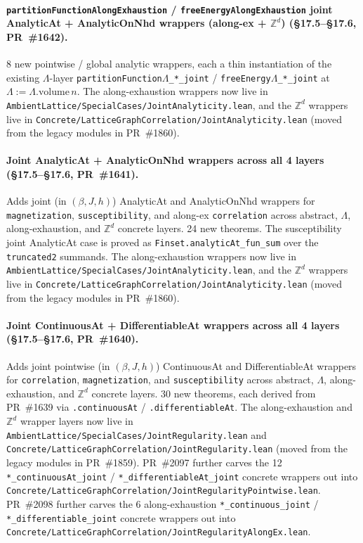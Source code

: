 \documentclass[a4paper,11pt]{article}
\newcommand{\LeanLambda}{\texorpdfstring{\ensuremath{\Lambda}}{Lambda}}
\begin{document}
\paragraph{\texttt{partitionFunctionAlongExhaustion} /
\texttt{freeEnergyAlongExhaustion} joint AnalyticAt + AnalyticOnNhd
wrappers (along-ex + $\mathbb{Z}^d$)
(\S17.5--\S17.6, PR~\#1642).} 8 new pointwise / global analytic
wrappers, each a thin instantiation of the existing $\Lambda$-layer
\texttt{partitionFunction\LeanLambda\_*\_joint} /
\texttt{freeEnergy\LeanLambda\_*\_joint} at
$\Lambda := \Lambda.\mathrm{volume}\,n$. The along-exhaustion wrappers
now live in
\texttt{AmbientLattice/SpecialCases/JointAnalyticity.lean}, and the
$\mathbb{Z}^d$ wrappers live in
\texttt{Concrete/LatticeGraphCorrelation/JointAnalyticity.lean}
(moved from the legacy modules in PR~\#1860).

\paragraph{Joint AnalyticAt + AnalyticOnNhd wrappers across
all 4 layers (\S17.5--\S17.6, PR~\#1641).} Adds joint (in
$(\beta, J, h)$) AnalyticAt and AnalyticOnNhd wrappers for
\texttt{magnetization}, \texttt{susceptibility}, and along-ex
\texttt{correlation} across abstract, $\Lambda$, along-exhaustion,
and $\mathbb{Z}^d$ concrete layers. 24 new theorems. The
susceptibility joint AnalyticAt case is proved as
\texttt{Finset.analyticAt\_fun\_sum} over the
\texttt{truncated2} summands. The along-exhaustion wrappers now live
in \texttt{AmbientLattice/SpecialCases/JointAnalyticity.lean}, and the
$\mathbb{Z}^d$ wrappers live in
\texttt{Concrete/LatticeGraphCorrelation/JointAnalyticity.lean}
(moved from the legacy modules in PR~\#1860).

\paragraph{Joint ContinuousAt + DifferentiableAt wrappers across
all 4 layers (\S17.5--\S17.6, PR~\#1640).} Adds joint pointwise
(in $(\beta, J, h)$) ContinuousAt and DifferentiableAt wrappers
for \texttt{correlation}, \texttt{magnetization}, and
\texttt{susceptibility} across abstract, $\Lambda$,
along-exhaustion, and $\mathbb{Z}^d$ concrete layers. 30 new
theorems, each derived from PR~\#1639 via
\texttt{.continuousAt} / \texttt{.differentiableAt}. The
along-exhaustion and $\mathbb{Z}^d$ wrapper layers now live in
\texttt{AmbientLattice/SpecialCases/JointRegularity.lean} and
\texttt{Concrete/LatticeGraphCorrelation/JointRegularity.lean}
(moved from the legacy modules in PR~\#1859). PR~\#2097 further carves
the 12 \texttt{*\_continuousAt\_joint} /
\texttt{*\_differentiableAt\_joint} concrete wrappers out into
\texttt{Concrete/LatticeGraphCorrelation/JointRegularityPointwise.lean}.
PR~\#2098 further carves the 6 along-exhaustion
\texttt{*\_continuous\_joint} / \texttt{*\_differentiable\_joint}
concrete wrappers out into
\texttt{Concrete/LatticeGraphCorrelation/JointRegularityAlongEx.lean}.
\end{document}
